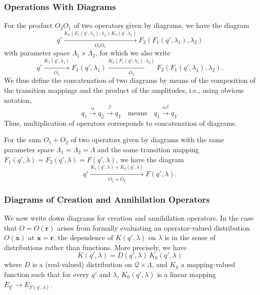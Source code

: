 \documentclass[12pt]{article}
\newcommand{\1}{\mathbf{1}} %
\newcommand{\conf}{\mathcal{Q}} %
\newcommand{\vx}{{\boldsymbol x}} %
\newcommand{\vr}{{\boldsymbol r}}
\begin{document}
\subsubsection{Operations With Diagrams}

For the product $O_2O_1$ of two operators given by diagrams, we have
the diagram
\begin{equation}\label{productarrow}
   q' \xrightarrow[O_2O_1]{K_2(F_1(q',\lambda_1),\lambda_2) \,
   K_1(q',\lambda_1)} F_2(F_1(q',\lambda_1),\lambda_2)
\end{equation}
with parameter space $\Lambda_1 \times \Lambda_2$, for which we
also write
\begin{equation}\label{concatarrow}
   q' \xrightarrow[O_1]{K_1(q',\lambda_1)} F_1(q',\lambda_1)
   \xrightarrow[O_2]{K_2(F_1(q',\lambda_1),\lambda_2)}
   F_2(F_1(q',\lambda_1),\lambda_2).
\end{equation}
We  thus define  the concatenation of two diagrams by means of
the composition of the transition mappings and the product of the
amplitudes,
i.e., using obvious notation,
\begin{equation}\label{shortconcatarrow}
   q_1 \xrightarrow{\alpha} q_2 \xrightarrow{\beta} q_3 \quad
   \text{means} \quad q_1 \xrightarrow{\alpha\beta} q_3.
\end{equation}
Thus, multiplication of operators corresponds to concatenation of
diagrams.

For the sum $O_1 +O_2$ of two operators given by diagrams with the
same parameter space $\Lambda_1 = \Lambda _2 = \Lambda$ and the same
transition mapping $F_1(q', \lambda) = F_2(q',\lambda) =
F(q',\lambda)$, we have the diagram
\begin{equation}\label{sumarrow}
   q' \xrightarrow[O_1 + O_2]{K_1(q',\lambda) + K_2(q',\lambda)}
   F(q',\lambda).
\end{equation}


\subsubsection{Diagrams of Creation and Annihilation Operators}

We now write down diagrams for creation and annihilation operators.
In the case that $O = O(\vr)$ arises from formally evaluating an
operator-valued distribution $O(\vx)$ at $\vx = \vr$, the dependence
of $K(q',\lambda)$ on $\lambda$ is  in the sense of distributions
rather than functions. More precisely, we have
\begin{equation}\label{Kdistribution}
   K(q',\lambda) = D(q',\lambda) \, K_0(q',\lambda)
\end{equation}
where $D$ is a (real-valued) distribution on $\conf \times \Lambda$,
and $K_0$ a mapping-valued function such that for every $q'$ and
$\lambda$, $K_0(q',\lambda)$ is a linear mapping $E_{q'} \to
E_{F(q',\lambda)}$.
\end{document}
